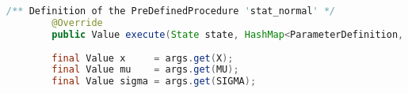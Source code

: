 \begin{center}
	\begin{lstlisting}[caption={execute method and parameter retrieval}, language={java}, label=lis:exampleCode]
		/** Definition of the PreDefinedProcedure 'stat_normal' */
		@Override
		public Value execute(State state, HashMap<ParameterDefinition, Value> args) throws SetlException {
		
        final Value x     = args.get(X);
        final Value mu    = args.get(MU);
        final Value sigma = args.get(SIGMA);
	\end{lstlisting}
\end{center}

  